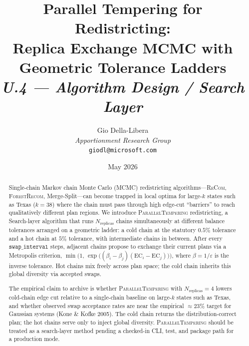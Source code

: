 \documentclass[12pt]{article}
\title{%
  \textbf{Parallel Tempering for Redistricting:}\\
  \textbf{Replica Exchange MCMC with Geometric Tolerance Ladders}\\[0.8em]
  \normalsize\textit{U.4 --- Algorithm Design / Search Layer}%
}
\author{%
  Gio Della-Libera\\
  \textit{Apportionment Research Group}\\
  \small\texttt{giodl@microsoft.com}
}
\date{May 2026}
\newcommand{\pt}{\textsc{ParallelTempering}}
\newcommand{\fr}{\textsc{ForestRecom}}
\newcommand{\recom}{\textsc{ReCom}}
\newcommand{\EC}{\mathrm{EC}}
\begin{document}
\maketitle

\begin{abstract}
\noindent
Single-chain Markov chain Monte Carlo (MCMC) redistricting algorithms---\recom{},
\fr{}, Merge-Split---can become trapped in local optima for large-$k$ states
such as Texas ($k=38$) where the chain must pass through high edge-cut
``barriers'' to reach qualitatively different plan regions.
We introduce \pt{} redistricting, a Search-layer algorithm that runs
$N_{\mathrm{replicas}}$ chains simultaneously at different balance tolerances
arranged on a geometric ladder: a cold chain at the statutory $0.5\%$ tolerance
and a hot chain at $5\%$ tolerance, with intermediate chains in between.
After every $\mathtt{swap\_interval}$ steps, adjacent chains propose to
exchange their current plans via a Metropolis criterion,
$\min\!\bigl(1,\, \exp\bigl((\beta_i - \beta_j)(\EC_i - \EC_j)\bigr)\bigr)$,
where $\beta = 1/\varepsilon$ is the inverse tolerance.
Hot chains mix freely across plan space; the cold chain inherits this global
diversity via accepted swaps.

The empirical claim to archive is whether \pt{} with
$N_{\mathrm{replicas}} = 4$ lowers cold-chain edge cut relative to a
single-chain baseline on large-$k$ states such as Texas, and whether observed
swap acceptance rates are near the empirical ${\approx}23\%$ target for
Gaussian systems (Kone \& Kofke 2005).
The cold chain returns the distribution-correct plan; the hot chains serve
only to inject global diversity.
\pt{} should be treated as a search-layer method pending a checked-in CLI,
test, and package path for a production mode.
\end{abstract}

\tableofcontents
\newpage











\end{document}
